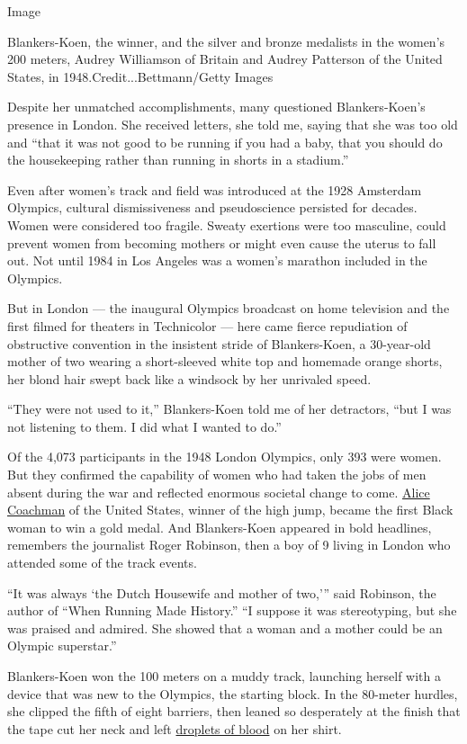 Image

Blankers-Koen, the winner, and the silver and bronze medalists in the
women's 200 meters, Audrey Williamson of Britain and Audrey Patterson of
the United States, in 1948.Credit...Bettmann/Getty Images

Despite her unmatched accomplishments, many questioned Blankers-Koen's
presence in London. She received letters, she told me, saying that she
was too old and ``that it was not good to be running if you had a baby,
that you should do the housekeeping rather than running in shorts in a
stadium.''

Even after women's track and field was introduced at the 1928 Amsterdam
Olympics, cultural dismissiveness and pseudoscience persisted for
decades. Women were considered too fragile. Sweaty exertions were too
masculine, could prevent women from becoming mothers or might even cause
the uterus to fall out. Not until 1984 in Los Angeles was a women's
marathon included in the Olympics.

But in London --- the inaugural Olympics broadcast on home television
and the first filmed for theaters in Technicolor --- here came fierce
repudiation of obstructive convention in the insistent stride of
Blankers-Koen, a 30-year-old mother of two wearing a short-sleeved white
top and homemade orange shorts, her blond hair swept back like a
windsock by her unrivaled speed.

``They were not used to it,'' Blankers-Koen told me of her detractors,
``but I was not listening to them. I did what I wanted to do.''

Of the 4,073 participants in the 1948 London Olympics, only 393 were
women. But they confirmed the capability of women who had taken the jobs
of men absent during the war and reflected enormous societal change to
come.
\href{https://www.nytimes3xbfgragh.onion/2014/07/15/sports/alice-coachman-90-dies-groundbreaking-medalist.html}{Alice
Coachman} of the United States, winner of the high jump, became the
first Black woman to win a gold medal. And Blankers-Koen appeared in
bold headlines, remembers the journalist Roger Robinson, then a boy of 9
living in London who attended some of the track events.

``It was always `the Dutch Housewife and mother of two,''' said
Robinson, the author of ``When Running Made History.'' ``I suppose it
was stereotyping, but she was praised and admired. She showed that a
woman and a mother could be an Olympic superstar.''

Blankers-Koen won the 100 meters on a muddy track, launching herself
with a device that was new to the Olympics, the starting block. In the
80-meter hurdles, she clipped the fifth of eight barriers, then leaned
so desperately at the finish that the tape cut her neck and left
\href{https://www.theguardian.com/sport/blog/2012/jan/18/fanny-blankers-koen-olympic-moments}{droplets
of blood} on her shirt.

